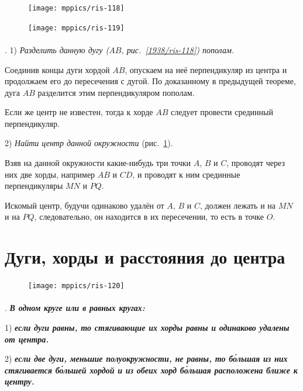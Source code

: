 \documentclass[twoside]{book}
\begin{document}
{

\begin{figure}
\centering
\bigskip
\texttt{[image: mppics/ris-118]}
\caption{}\label{1938/ris-118}
\bigskip
\texttt{[image: mppics/ris-119]}
\caption{}\label{1938/ris-119}
\end{figure}

\paragraph{}\label{1938/108}
\mbox{.}
1) \emph{Разделить данную дугу \emph{($AB$, рис.~\ref{1938/ris-118})} пополам.}

Соединив концы дуги хордой $AB$, опускаем на неё перпендикуляр из центра и продолжаем его до пересечения с дугой.
По доказанному в предыдущей теореме, дуга $AB$ разделится этим перпендикуляром пополам.

Если же центр не известен, тогда к хорде $AB$ следует провести срединный перпендикуляр. 

2) \emph{Найти центр данной окружности} (рис.~\ref{1938/ris-119}).

Взяв на данной окружности какие-нибудь три точки $A$, $B$ и $C$, проводят через них две хорды, например $AB$ и $CD$, и проводят к ним срединные перпендикуляры $MN$ и $PQ$. 

Искомый центр, будучи одинаково удалён от $A$, $B$ и $C$, должен лежать и на $MN$ и на $PQ$, следовательно, он находится в их пересечении, то есть в точке $O$.

}

\section{Дуги, хорды и расстояния до центра}

\begin{figure}
\centering
\texttt{[image: mppics/ris-120]}
\caption{}\label{1938/ris-120}
\end{figure}

\paragraph{}\label{1938/109}
\mbox{.}
\textbf{\emph{В одном круге или в равных кругах:}}

1) \textbf{\emph{если дуги равны, то стягивающие их хорды равны и одинаково удалены от центра.}}

2) \textbf{\emph{если две дуги, меньшие полуокружности, не равны, то б\'{о}льшая из них стягивается б\'{о}льшей хордой и из обеих хорд б\'{о}льшая расположена ближе к центру.}}
\end{document}
